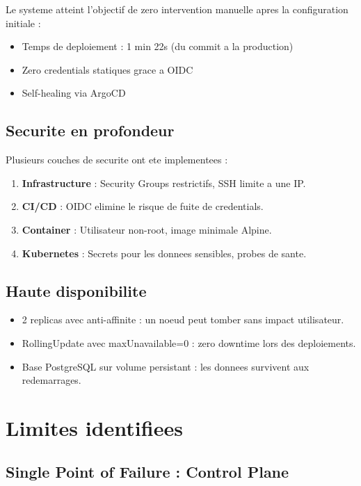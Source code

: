 \documentclass[12pt,a4paper,french]{report}
\begin{document}
Le systeme atteint l'objectif de zero intervention manuelle apres la configuration initiale :
\begin{itemize}
    \item Temps de deploiement : 1 min 22s (du commit a la production)
    \item Zero credentials statiques grace a OIDC
    \item Self-healing via ArgoCD
\end{itemize}

\subsection{Securite en profondeur}

Plusieurs couches de securite ont ete implementees :
\begin{enumerate}
    \item \textbf{Infrastructure} : Security Groups restrictifs, SSH limite a une IP.
    \item \textbf{CI/CD} : OIDC elimine le risque de fuite de credentials.
    \item \textbf{Container} : Utilisateur non-root, image minimale Alpine.
    \item \textbf{Kubernetes} : Secrets pour les donnees sensibles, probes de sante.
\end{enumerate}

\subsection{Haute disponibilite}

\begin{itemize}
    \item 2 replicas avec anti-affinite : un noeud peut tomber sans impact utilisateur.
    \item RollingUpdate avec maxUnavailable=0 : zero downtime lors des deploiements.
    \item Base PostgreSQL sur volume persistant : les donnees survivent aux redemarrages.
\end{itemize}

\section{Limites identifiees}

\subsection{Single Point of Failure : Control Plane}
\end{document}
